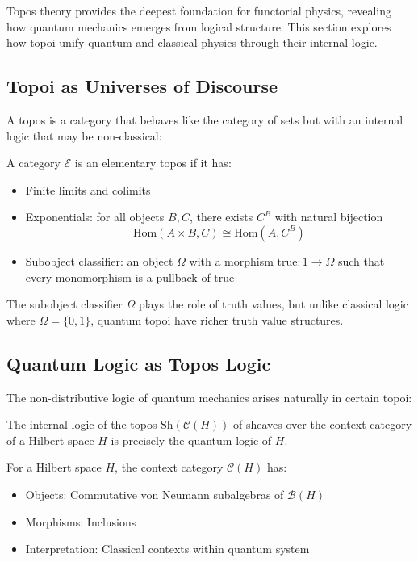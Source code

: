 Topos theory provides the deepest foundation for functorial physics, revealing how quantum mechanics emerges from logical structure. This section explores how topoi unify quantum and classical physics through their internal logic.

\subsection{Topoi as Universes of Discourse}

A topos is a category that behaves like the category of sets but with an internal logic that may be non-classical:

\begin{definition}
A category $\mathcal{E}$ is an elementary topos if it has:
\begin{itemize}
\item Finite limits and colimits
\item Exponentials: for all objects $B, C$, there exists $C^B$ with natural bijection
  \[
  \text{Hom}(A \times B, C) \cong \text{Hom}(A, C^B)
  \]
\item Subobject classifier: an object $\Omega$ with a morphism $\text{true}: 1 \to \Omega$ such that every monomorphism is a pullback of $\text{true}$
\end{itemize}
\end{definition}

The subobject classifier $\Omega$ plays the role of truth values, but unlike classical logic where $\Omega = \{0,1\}$, quantum topoi have richer truth value structures.

\subsection{Quantum Logic as Topos Logic}

The non-distributive logic of quantum mechanics arises naturally in certain topoi:

\begin{theorem}
The internal logic of the topos $\text{Sh}(\mathcal{C}(H))$ of sheaves over the context category of a Hilbert space $H$ is precisely the quantum logic of $H$.
\end{theorem}

\begin{definition}
For a Hilbert space $H$, the context category $\mathcal{C}(H)$ has:
\begin{itemize}
\item Objects: Commutative von Neumann subalgebras of $\mathcal{B}(H)$
\item Morphisms: Inclusions
\item Interpretation: Classical contexts within quantum system
\end{itemize}
\end{definition}

